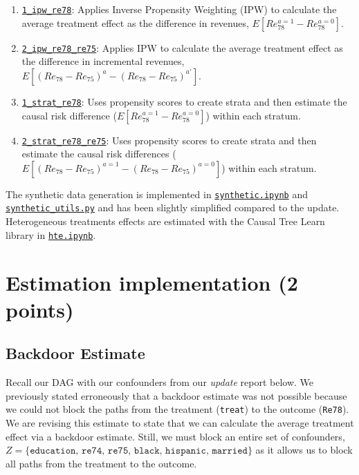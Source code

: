 \documentclass[12pt]{article}
\begin{document}
\begin{enumerate}[itemsep=-0.25em]
    \item \href{https://github.com/cs396s24/Proj-Job-Training/blob/main/prop/1_ipw_re78.ipynb}{\tt{1\_ipw\_re78}}: Applies Inverse Propensity Weighting (IPW) to calculate the average treatment effect as the difference in revenues, $E[Re_{78}^{a=1} - Re_{78}^{a=0}]$.
    \item \href{https://github.com/cs396s24/Proj-Job-Training/blob/main/prop/2_ipw_re78_re75.ipynb}{\tt{2\_ipw\_re78\_re75}}: Applies IPW to calculate the average treatment effect as the difference in incremental revenues, $E[(Re_{78} - Re_{75})^{a} - (Re_{78} - Re_{75})^{a'}]$.
    \item \href{https://github.com/cs396s24/Proj-Job-Training/blob/main/prop/1_strat_re78.ipynb}{\tt{1\_strat\_re78}}: Uses propensity scores to create strata and then estimate the causal risk difference ($E[Re_{78}^{a=1} - Re_{78}^{a=0}]$) within each stratum.
    \item \href{https://github.com/cs396s24/Proj-Job-Training/blob/main/prop/2_strat_re78_re75.ipynb}{\tt{2\_strat\_re78\_re75}}: Uses propensity scores to create strata and then estimate the causal risk differences ($E[(Re_{78} - Re_{75})^{a=1} - (Re_{78} - Re_{75})^{a=0}]$) within each stratum.
\end{enumerate}
The synthetic data generation is implemented in \href{https://github.com/cs396s24/Proj-Job-Training/blob/main/synthetic/synthetic.ipynb}{\tt{synthetic.ipynb}} and \href{https://github.com/cs396s24/Proj-Job-Training/blob/main/utils/synthetic_utils.py} {\tt{synthetic\_utils.py}} and has been slightly simplified compared to the update. 
Heterogeneous treatments effects are estimated with the Causal Tree Learn library in \href{https://github.com/cs396s24/Proj-Job-Training/blob/main/hte/hte.ipynb}{\tt{hte.ipynb}}.

\section{Estimation implementation (2 points)}

\subsection{Backdoor Estimate}

Recall our DAG with our confounders from our \textit{update} report below. We previously stated erroneously that a backdoor estimate was not possible because we could not block the paths from the treatment (\texttt{treat}) to the outcome (\texttt{Re78}). We are revising this estimate to state that we can calculate the average treatment effect via a backdoor estimate. Still, we must block an entire set of confounders, $Z = \{\texttt{education, re74, re75, black, hispanic, married}\}$ as it allows us to block all paths from the treatment to the outcome.
\end{document}
